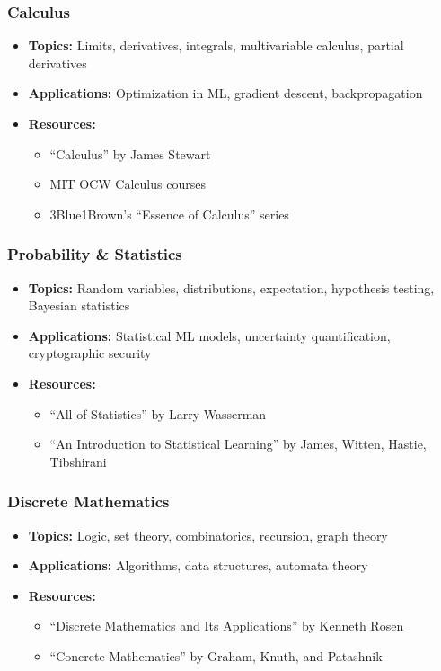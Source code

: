\documentclass{article}
\begin{document}
\subsubsection{Calculus}
\begin{itemize}[leftmargin=*]
    \item \textbf{Topics:} Limits, derivatives, integrals, multivariable calculus, partial derivatives
    \item \textbf{Applications:} Optimization in ML, gradient descent, backpropagation
    \item \textbf{Resources:}
    \begin{itemize}
        \item ``Calculus'' by James Stewart
        \item MIT OCW Calculus courses
        \item 3Blue1Brown's ``Essence of Calculus'' series
    \end{itemize}
\end{itemize}

\subsubsection{Probability \& Statistics}
\begin{itemize}[leftmargin=*]
    \item \textbf{Topics:} Random variables, distributions, expectation, hypothesis testing, Bayesian statistics
    \item \textbf{Applications:} Statistical ML models, uncertainty quantification, cryptographic security
    \item \textbf{Resources:}
    \begin{itemize}
        \item ``All of Statistics'' by Larry Wasserman
        \item ``An Introduction to Statistical Learning'' by James, Witten, Hastie, Tibshirani
    \end{itemize}
\end{itemize}

\subsubsection{Discrete Mathematics}
\begin{itemize}[leftmargin=*]
    \item \textbf{Topics:} Logic, set theory, combinatorics, recursion, graph theory
    \item \textbf{Applications:} Algorithms, data structures, automata theory
    \item \textbf{Resources:}
    \begin{itemize}
        \item ``Discrete Mathematics and Its Applications'' by Kenneth Rosen
        \item ``Concrete Mathematics'' by Graham, Knuth, and Patashnik
    \end{itemize}
\end{itemize}
\end{document}
